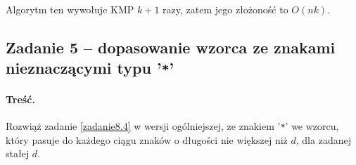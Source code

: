 Algorytm ten wywołuje KMP $k+1$ razy, zatem jego złożoność to $O(nk)$.

\subsection{Zadanie 5 -- dopasowanie wzorca ze znakami nieznaczącymi typu '\texttt{*}'}
\paragraph{Treść.}
Rozwiąż zadanie \ref{zadanie8.4} w wersji ogólniejszej, ze znakiem '\texttt{*}' we wzorcu, który pasuje do każdego ciągu znaków o długości nie większej niż $d$, dla zadanej stałej $d$.
